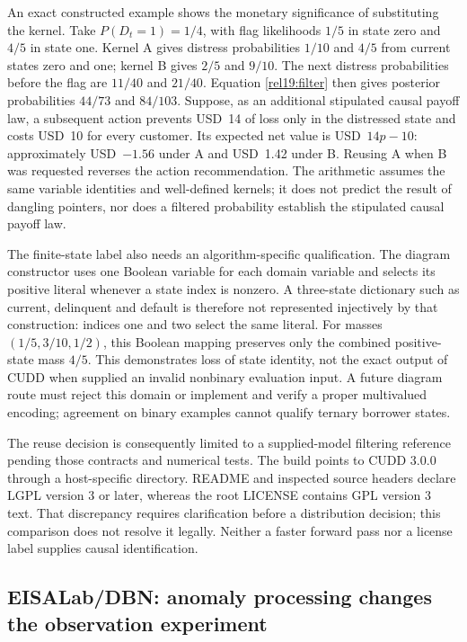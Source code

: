 An exact constructed example shows the monetary significance of substituting
the kernel. Take $P(D_t=1)=1/4$, with flag likelihoods $1/5$ in state zero and
$4/5$ in state one. Kernel A gives distress probabilities $1/10$ and $4/5$
from current states zero and one; kernel B gives $2/5$ and $9/10$. The next
distress probabilities before the flag are $11/40$ and $21/40$. Equation
\eqref{rel19:filter} then gives posterior probabilities $44/73$ and $84/103$.
Suppose, as an additional stipulated causal payoff law, a subsequent action
prevents USD~14 of loss only in the distressed state and costs USD~10 for
every customer. Its expected net value is USD~$14p-10$: approximately
USD~$-1.56$ under A and USD~1.42 under B. Reusing A when B was requested reverses
the action recommendation. The arithmetic assumes the same variable identities
and well-defined kernels; it does not predict the result of dangling pointers,
nor does a filtered probability establish the stipulated causal payoff law.
\citep{rel19dbnwitness}

The finite-state label also needs an algorithm-specific qualification. The
diagram constructor uses one Boolean variable for each domain variable and
selects its positive literal whenever a state index is nonzero. A three-state
dictionary such as current, delinquent and default is therefore not represented
injectively by that construction: indices one and two select the same literal.
For masses $(1/5,3/10,1/2)$, this Boolean mapping preserves only the combined
positive-state mass $4/5$. This demonstrates loss of state identity, not the
exact output of CUDD when supplied an invalid nonbinary evaluation input. A
future diagram route must reject this domain or implement and verify a proper
multivalued encoding; agreement on binary examples cannot qualify ternary
borrower states. \citep{rel19dbnpp,rel19dbnwitness}

The reuse decision is consequently limited to a supplied-model filtering
reference pending those contracts and numerical tests. The build points to
CUDD 3.0.0 through a host-specific directory. README and inspected source
headers declare LGPL version 3 or later, whereas the root LICENSE contains
GPL version 3 text. That discrepancy requires clarification before a
distribution decision; this comparison does not resolve it legally. Neither
a faster forward pass nor a license label supplies causal identification.
\citep{rel19dbnpp}

\subsection{EISALab/DBN: anomaly processing changes the observation experiment}
\label{rel19:eisadbn}

